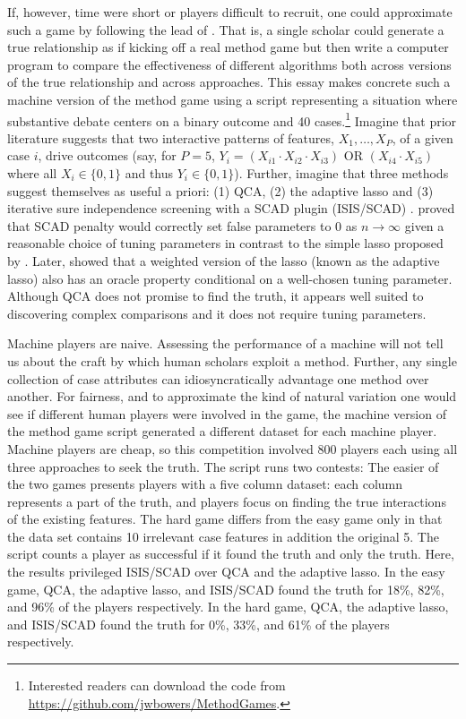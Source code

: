 \documentclass[12pt]{article}
\begin{document}
If, however, time were short or players difficult to recruit, one could
approximate such a game by following the lead of \citet{lucasfk2013}. That is,
a single scholar could generate a true relationship as if kicking off a real
method game but then write a computer program to compare the effectiveness of
different algorithms both across versions of the true relationship and across
approaches. This essay makes concrete such a machine version of the method
game using a script representing a situation where substantive debate centers
on a binary outcome and 40 cases.\footnote{Interested readers can download the
  code from \url{https://github.com/jwbowers/MethodGames}.} Imagine that prior
literature suggests that two interactive patterns of features, $X_1, \ldots,
X_P$, of a given case $i$, drive outcomes (say, for $P=5$, $Y_i= (X_{i1} \cdot
X_{i2} \cdot X_{i3} ) \text{ OR } ( X_{i4} \cdot X_{i5} )$ where all $X_i  \in
\{0,1\}$ and thus $Y_i \in \{0,1\}$).  Further, imagine that three methods
suggest themselves as useful a priori: (1) QCA, (2) the adaptive lasso and (3)
iterative sure independence screening with a SCAD plugin (ISIS/SCAD)
\citep{fan2008sure}.  \citet{fan2001variable} proved that SCAD penalty would
correctly set false parameters to 0 as $n \rightarrow \infty$ given a
reasonable choice of tuning parameters in contrast to the simple lasso
proposed by  \cite{tibshirani1996regression}.  Later, \citet{zou2006adaptive}
showed that a weighted version of the lasso (known as the adaptive lasso) also
has an oracle property conditional on a well-chosen tuning parameter. Although
QCA does not promise to find the truth, it appears well suited to discovering
complex comparisons and it does not require tuning parameters.

Machine players are naive. Assessing the performance of a machine will not
tell us about the craft by which human scholars exploit a method.  Further,
any single collection of case attributes can idiosyncratically advantage one
method over another. For fairness, and to approximate the kind of natural
variation one would see if different human players were involved in the game,
the machine version of the method game script generated a different dataset
for each machine player.  Machine players are cheap, so this competition
involved 800 players each using all three approaches to seek the truth.  The
script runs two contests: The easier of the two games presents players with a
five column dataset: each column represents a part of the truth, and players
focus on finding the true interactions of the existing features.  The hard
game differs from the easy game only in that the data set contains 10
irrelevant case features in addition the original 5.  The script counts a
player as successful if it found the truth and only the truth.  Here, the
results privileged ISIS/SCAD over QCA and the adaptive lasso. In the easy
game, QCA, the adaptive lasso, and ISIS/SCAD found the truth for 18\%, 82\%,
and 96\% of the players respectively. In the hard game, QCA, the adaptive
lasso, and ISIS/SCAD found the truth for 0\%, 33\%, and 61\% of the players
respectively.
\end{document}
